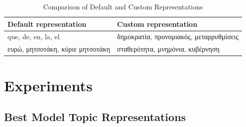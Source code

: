 \begin{table}[H]
\centering
\begin{tabular}{ll}
\toprule
Default representation & Custom representation \\
\midrule
que, de, en, la, el & \textgreek{δημοκρατία, προνομιακός, μεταρρυθμίσεις} \\
\textgreek{ευρώ, μητσοτάκη, κύριε μητσοτάκη} & \textgreek{σταθερότητα, μνημόνια, κυβέρνηση} \\
\bottomrule
\end{tabular}
\caption{Comparison of Default and Custom Representations}
\label{tab:topics_compare}
\end{table}

\section{Experiments}

\subsection{Best Model Topic Representations}
\label{sec:appExpBest}

